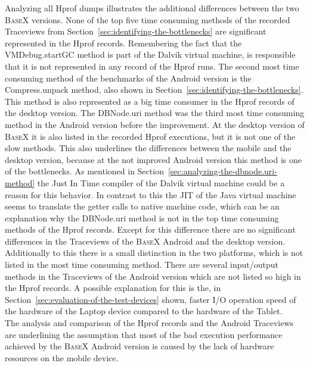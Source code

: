 Analyzing all Hprof dumps illustrates the additional differences between the two \textsc{BaseX} versions.
None of the top five time consuming methods of the recorded Traceviews from Section~\ref{sec:identifying-the-bottlenecks} are significant represented in the Hprof records.
Remembering the fact that the \textsf{VMDebug.startGC} method is part of the Dalvik virtual machine, is responsible that it is not represented in any record of the Hprof runs.
The second most time consuming method of the benchmarks of the Android version is the \textsf{Compress.unpack} method, also shown in Section~\ref{sec:identifying-the-bottlenecks}.
This method is also represented as a big time consumer in the Hprof records of the desktop version.
The \textsf{DBNode.uri} method was the third most time consuming method in the Android version before the improvement.
At the desktop version of \textsc{BaseX} it is also listed in the recorded Hprof executions, but it is not one of the slow methods.
This also underlines the differences between the mobile and the desktop version, because at the not improved Android version this method is one of the bottlenecks.
As mentioned in Section~\ref{sec:analyzing-the-dbnode.uri-method} the Just In Time compiler of the Dalvik virtual machine could be a reason for this behavior.
In contrast to this the JIT of the Java virtual machine seems to translate the getter calls to native machine code, which can be an explanation why the \textsf{DBNode.uri} method is not in the top time consuming methods of the Hprof records.
Except for this difference there are no significant differences in the Traceviews of the \textsc{BaseX} Android and the desktop version.
Additionally to this there is a small distinction in the two platforms, which is not listed in the most time consuming method.
There are several input/output methods in the Traceviews of the Android version which are not listed so high in the Hprof records.
A possible explanation for this is the, in Section~\ref{sec:evaluation-of-the-test-devices} shown, faster I/O operation speed of the hardware of the Laptop device compared to the hardware of the Tablet.\\
The analysis and comparison of the Hprof records and the Android Traceviews are underlining the assumption that most of the bad execution performance achieved by the \textsc{BaseX} Android version is caused by the lack of hardware resources on the mobile device.




